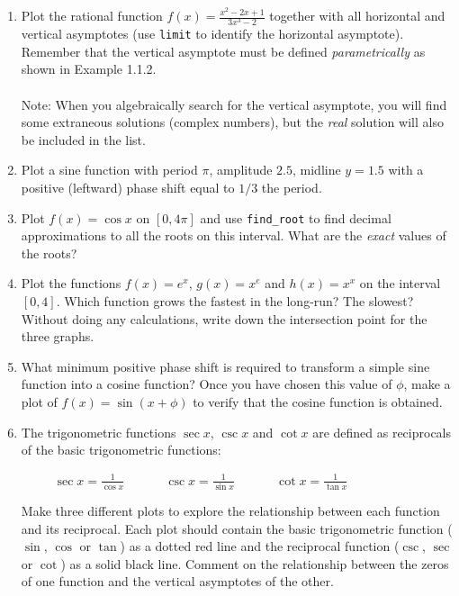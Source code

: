 \documentclass[10.5pt,twoside]{report}
\theoremstyle{definition}
\begin{document}
\begin{enumerate}

\item
Plot the rational function $f(x)=\frac{x^2-2x+1}{3x^3-2}$ together with all horizontal and vertical asymptotes (use \verb|limit| to identify the horizontal asymptote).  Remember that the vertical asymptote must be defined \textit{parametrically} as shown in Example 1.1.2. \\
${}$\\
Note: When you algebraically search for the vertical asymptote, you will find some extraneous solutions (complex numbers), but the \textit{real} solution will also be included in the list.

\item  
Plot a sine function with period $\pi$, amplitude $2.5$, midline $y=1.5$ with a positive (leftward) phase shift equal to $1/3$ the period.  

\item
Plot $f(x)=\cos{x}$ on $[0,4\pi]$ and use \verb|find_root| to find decimal approximations to all the roots on this interval.  What are the \textit{exact} values of the roots?

\item
Plot the functions $f(x)=e^x$, $g(x)=x^e$ and $h(x)=x^x$ on the interval $[0,4]$.  Which function grows the fastest in the long-run?  The slowest?  Without doing any calculations, write down the intersection point for the three graphs.

\item
What minimum positive phase shift is required to transform a simple sine function into a cosine function?  Once you have chosen this value of $\phi$, make a plot of $f(x)=\sin{(x+\phi)}$ to verify that the cosine function is obtained.

\item
The trigonometric functions $\sec{x}$, $\csc{x}$ and $\cot{x}$ are defined as reciprocals of the basic trigonometric functions:

\verb|     |  $\sec{x}=\displaystyle \frac{1}{\cos{x}}$
\verb|     |  $\csc{x}=\displaystyle \frac{1}{\sin{x}}$
\verb|     |  $\cot{x}=\displaystyle \frac{1}{\tan{x}}$



Make three different plots to explore the relationship between each function and its reciprocal.  Each plot should contain the basic trigonometric function ($\sin$, $\cos$ or $\tan$) as a dotted red line and the reciprocal function ($\csc$, $\sec$ or $\cot$) as a solid black line.  Comment on the relationship between the zeros of one function and the vertical asymptotes of the other.




\end{enumerate}
\end{document}
